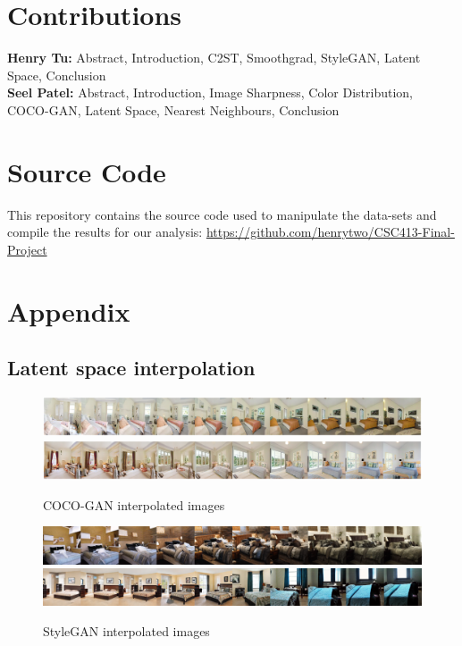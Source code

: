 \documentclass{article}
\begin{document}
    \section{Contributions}
    \textbf{Henry Tu:} Abstract, Introduction, C2ST, Smoothgrad, StyleGAN, Latent Space, Conclusion\\
    \textbf{Seel Patel:} Abstract, Introduction, Image Sharpness, Color Distribution, COCO-GAN, Latent Space, Nearest Neighbours, Conclusion
    
    \section{Source Code}
    This repository contains the source code used to manipulate the data-sets and compile the results for our analysis: \href{https://github.com/henrytwo/CSC413-Final-Project}{https://github.com/henrytwo/CSC413-Final-Project}
    
    
    \newpage
    \section{Appendix}
    \subsection{Latent space interpolation}

    \begin{figure}[H]
          \centering
          \includegraphics[scale=0.145]{latent-space/coco_latent_ex.png}
          \includegraphics[scale=0.145]{latent-space/cocogan_latent_interesting.png}
          \caption{COCO-GAN interpolated images}
    \end{figure}
     \begin{figure}[H]
          \centering
          \includegraphics[scale=0.4]{latent-space/stylegan_latent_1.png}
          \includegraphics[scale=0.4]{latent-space/stylegan_latent_2.png}
          \caption{StyleGAN interpolated images}
    \end{figure} 
    \newpage
\end{document}
